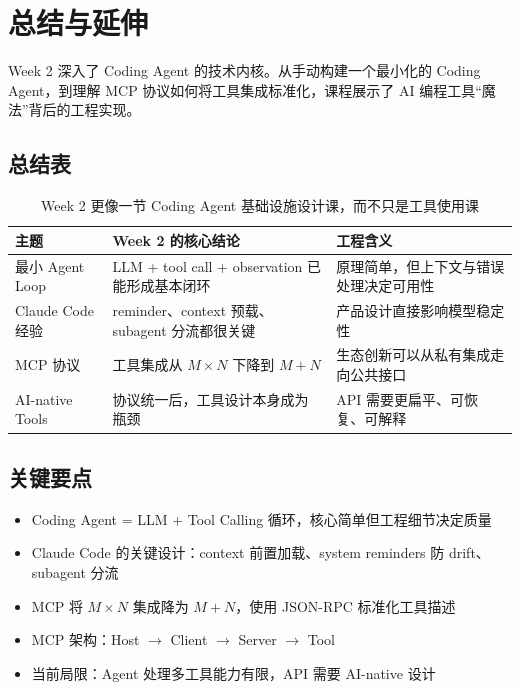 \section{总结与延伸}

Week 2 深入了 Coding Agent 的技术内核。从手动构建一个最小化的 Coding Agent，到理解 MCP 协议如何将工具集成标准化，课程展示了 AI 编程工具``魔法''背后的工程实现。

\subsection{总结表}

\begin{table}[H]
\centering
\begin{tabular}{p{2.8cm}p{4.2cm}p{4.0cm}}
\toprule
\textbf{主题} & \textbf{Week 2 的核心结论} & \textbf{工程含义} \\
\midrule
最小 Agent Loop & LLM + tool call + observation 已能形成基本闭环 & 原理简单，但上下文与错误处理决定可用性 \\
Claude Code 经验 & reminder、context 预载、subagent 分流都很关键 & 产品设计直接影响模型稳定性 \\
MCP 协议 & 工具集成从 $M \times N$ 下降到 $M + N$ & 生态创新可以从私有集成走向公共接口 \\
AI-native Tools & 协议统一后，工具设计本身成为瓶颈 & API 需要更扁平、可恢复、可解释 \\
\bottomrule
\end{tabular}
\caption{Week 2 更像一节 Coding Agent 基础设施设计课，而不只是工具使用课}
\end{table}

\subsection{关键要点}

\begin{itemize}
    \item Coding Agent = LLM + Tool Calling 循环，核心简单但工程细节决定质量
    \item Claude Code 的关键设计：context 前置加载、system reminders 防 drift、subagent 分流
    \item MCP 将 $M \times N$ 集成降为 $M + N$，使用 JSON-RPC 标准化工具描述
    \item MCP 架构：Host $\rightarrow$ Client $\rightarrow$ Server $\rightarrow$ Tool
    \item 当前局限：Agent 处理多工具能力有限，API 需要 AI-native 设计
\end{itemize}

